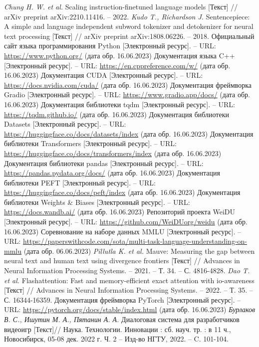 \begin{thebibliography}{99}
  \textit{Chung H. W. et al.} Scaling instruction-finetuned language models [Текст] // arXiv preprint arXiv:2210.11416. – 2022.
  \textit{Kudo T., Richardson J.} Sentencepiece: A simple and language independent subword tokenizer and detokenizer for neural text processing [Текст] // arXiv preprint arXiv:1808.06226. – 2018.
  Официальный сайт языка программирования Python [Электронный ресурс]. -- URL: \url{https://www.python.org/} (дата обр. 16.06.2023)
  Документация языка C++ [Электронный ресурс]. -- URL: \url{https://en.cppreference.com/w/} (дата обр. 16.06.2023)
  Документация CUDA [Электронный ресурс]. -- URL: \url{https://docs.nvidia.com/cuda/} (дата обр. 16.06.2023)
  Документация фреймворка Gradio [Электронный ресурс]. -- URL: \url{https://www.gradio.app/docs/} (дата обр. 16.06.2023)
  Документация библиотеки tqdm [Электронный ресурс]. -- URL: \url{https://tqdm.github.io/} (дата обр. 16.06.2023)
  Документация библиотеки Datasets [Электронный ресурс]. -- URL: \url{https://huggingface.co/docs/datasets/index} (дата обр. 16.06.2023)
  Документация библиотеки Transformers [Электронный ресурс]. -- URL: \url{https://huggingface.co/docs/transformers/index} (дата обр. 16.06.2023)
  Документация библиотеки pandas [Электронный ресурс]. -- URL: \url{https://pandas.pydata.org/docs/} (дата обр. 16.06.2023)
  Документация библиотеки PEFT [Электронный ресурс]. -- URL: \url{https://huggingface.co/docs/peft/index} (дата обр. 16.06.2023)
  Документация библиотеки Weights \& Biases [Электронный ресурс]. -- URL: \url{https://docs.wandb.ai/} (дата обр. 16.06.2023)
  Репозиторий проекта WeiDU [Электронный ресурс]. -- URL: \url{https://github.com/WeiDUorg/weidu} (дата обр. 16.06.2023)
  Соревнование на наборе данных MMLU [Электронный ресурс]. -- URL: \url{https://paperswithcode.com/sota/multi-task-language-understanding-on-mmlu} (дата обр. 06.06.2023)
  \textit{Pillutla K. et al.} Mauve: Measuring the gap between neural text and human text using divergence frontiers [Текст] // Advances in Neural Information Processing Systems. – 2021. – Т. 34. – С. 4816-4828.
  \textit{Dao T. et al.} Flashattention: Fast and memory-efficient exact attention with io-awareness [Текст] // Advances in Neural Information Processing Systems. – 2022. – Т. 35. – С. 16344-16359.
  Документация фреймворка PyTorch [Электронный ресурс]. -- URL: \url{https://pytorch.org/docs/stable/index.html} (дата обр. 16.06.2023)
  \textit{Бурлаков В. С., Ишутин М. А., Пятанин А. А.} Диалоговая система для разработчиков видеоигр [Текст]// Наука. Технологии. Инновации : сб. науч. тр. : в 11 ч., Новосибирск, 05-08 дек. 2022 г. Ч. 2 -- Изд-во НГТУ, 2022. -- C. 101-104.
\end{thebibliography}